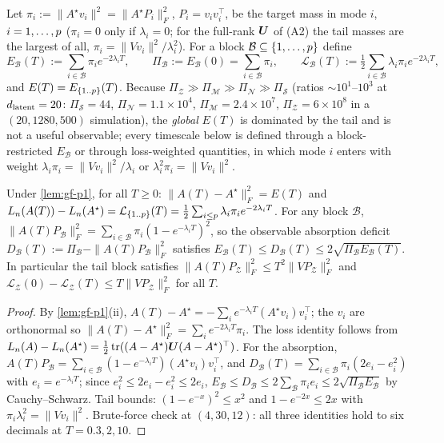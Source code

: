 \begin{definition}\label{def:rse-p1}
Let $\pi_i:=\|A^\star v_i\|^2=\|A^\star P_i\|_F^2$, $P_i=v_iv_i^{\top}$, be the target mass in mode $i$, $i=1,\dots,p$ ($\pi_i=0$ only if $\lambda_i=0$; for the full-rank $\bm{U}$ of (A2) the tail masses are the largest of all, $\pi_i=\|Vv_i\|^2/\lambda_i^2$). For a block $\mathcal B\subseteq\{1,\dots,p\}$ define
\[
E_{\mathcal B}(T):=\sum_{i\in\mathcal B}\pi_ie^{-2\lambda_iT},\qquad \Pi_{\mathcal B}:=E_{\mathcal B}(0)=\sum_{i\in\mathcal B}\pi_i,\qquad
\mathcal L_{\mathcal B}(T):=\tfrac12\sum_{i\in\mathcal B}\lambda_i\pi_ie^{-2\lambda_iT},
\]
and $E(T)=E_{\{1..p\}}(T)$. Because $\Pi_{\mathcal Z}\gg\Pi_{\mathcal M}\gg\Pi_{\mathcal N}\gg\Pi_{\mathcal S}$ (ratios $\sim10^1$--$10^3$ at $d_{\mathrm{latent}}=20$: $\Pi_{\mathcal S}=44$, $\Pi_{\mathcal N}=1.1\times10^4$, $\Pi_{\mathcal M}=2.4\times10^7$, $\Pi_{\mathcal Z}=6\times10^8$ in a $(20,1280,500)$ simulation), the \emph{global} $E(T)$ is dominated by the tail and is not a useful observable; every timescale below is defined through a block-restricted $E_{\mathcal B}$ or through loss-weighted quantities, in which mode $i$ enters with weight $\lambda_i\pi_i=\|Vv_i\|^2/\lambda_i$ or $\lambda_i^2\pi_i=\|Vv_i\|^2$.
\end{definition}

\begin{proposition}\label{prop:rse-p1}
Under \cref{lem:gf-p1}, for all $T\ge0$: $\|A(T)-A^\star\|_F^2=E(T)$ and $L_{n}(A(T))-L_{n}(A^\star)=\mathcal L_{\{1..p\}}(T)=\tfrac12\sum_{i\le p}\lambda_i\pi_ie^{-2\lambda_iT}$. For any block $\mathcal B$, $\|A(T)P_{\mathcal B}\|_F^2=\sum_{i\in\mathcal B}\pi_i(1-e^{-\lambda_iT})^2$, so the observable absorption deficit $D_{\mathcal B}(T):=\Pi_{\mathcal B}-\|A(T)P_{\mathcal B}\|_F^2$ satisfies $E_{\mathcal B}(T)\le D_{\mathcal B}(T)\le2\sqrt{\Pi_{\mathcal B}E_{\mathcal B}(T)}$. In particular the tail block satisfies $\|A(T)P_{\mathcal Z}\|_F^2\le T^2\|VP_{\mathcal Z}\|_F^2$ and $\mathcal L_{\mathcal Z}(0)-\mathcal L_{\mathcal Z}(T)\le T\|VP_{\mathcal Z}\|_F^2$ for all $T$.
\end{proposition}
\begin{proof}
By \cref{lem:gf-p1}(ii), $A(T)-A^\star=-\sum_ie^{-\lambda_iT}(A^\star v_i)v_i^{\top}$; the $v_i$ are orthonormal so $\|A(T)-A^\star\|_F^2=\sum_ie^{-2\lambda_iT}\pi_i$. The loss identity follows from $L_{n}(A)-L_{n}(A^\star)=\tfrac12\operatorname{tr}((A-A^\star)\bm{U}(A-A^\star)^{\top})$. For the absorption, $A(T)P_{\mathcal B}=\sum_{i\in\mathcal B}(1-e^{-\lambda_iT})(A^\star v_i)v_i^{\top}$, and $D_{\mathcal B}(T)=\sum_{i\in\mathcal B}\pi_i(2e_i-e_i^2)$ with $e_i=e^{-\lambda_iT}$; since $e_i^2\le2e_i-e_i^2\le2e_i$, $E_{\mathcal B}\le D_{\mathcal B}\le2\sum_{\mathcal B}\pi_ie_i\le2\sqrt{\Pi_{\mathcal B}E_{\mathcal B}}$ by Cauchy--Schwarz. Tail bounds: $(1-e^{-x})^2\le x^2$ and $1-e^{-2x}\le2x$ with $\pi_i\lambda_i^2=\|Vv_i\|^2$. Brute-force check at $(4,30,12)$: all three identities hold to six decimals at $T=0.3,2,10$.
\end{proof}

